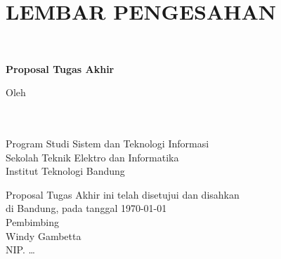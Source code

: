 \chapter*{LEMBAR PENGESAHAN}


\begin{center}
    \vspace{2cm}
  {\large\bfseries \judulta}\\
     \vspace{2cm}

  {\Large \textbf{Proposal Tugas Akhir}}\\


  \vspace{1.5cm}
    
    
  {\large Oleh}\\[0.3cm]
    \textbf{
    {\large \namapenulis}\\
    {\large \nimpenulis}
  }\\
    
  \vspace{0.5cm}
 
  {\large Program Studi Sistem dan Teknologi Informasi}\\
  {\large Sekolah Teknik Elektro dan Informatika}\\
  {\large Institut Teknologi Bandung}\\

  \vspace{1.5cm}

  Proposal Tugas Akhir ini telah disetujui dan disahkan\\ 
  di Bandung, pada tanggal \today\\[1cm]

	Pembimbing  \\[3cm]
	Windy Gambetta   \\[0.2cm] %
	NIP. \dots %

\end{center}

\vspace{1cm}
\noindent



